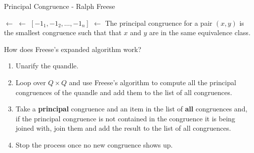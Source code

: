 \tiny
\begin{frame}{Principal Congruence - Ralph Freese}
    \begin{algorithm}[H]

\DontPrintSemicolon
\caption{Principal congruence generated by pair $x,y$ - \texttt{Cg(\textsf{L}$, x, y$)}}




\pairs $\leftarrow$ \;
\partition $\leftarrow$ $[-1_1, -1_2, \dots, -1_n]$\;
\partition $\leftarrow$ \;
\Return{\partition}
\normalsize
The principal congruence for a pair $(x,y)$ is the smallest congruence such that that $x$ and $y$ are in the same equivalence class. 
\end{algorithm}

\end{frame}
\begin{frame}{How does Freese's expanded algorithm work?}
\normalsize
    \begin{enumerate}
        \item Unarify the quandle.
        \item Loop over $Q\times Q$ and use Freese's algorithm to compute all the principal congruences of the quandle and add them to the list of all congruences.
        
        \item Take a \textbf{principal} congruence and an item in the list of \textbf{all} congruences and, if the principal congruence is not contained in the congruence it is being joined with, join them and add the result to the list of all congruences. 
        \item Stop the process once no new congruence shows up.
    \end{enumerate}
\end{frame}

